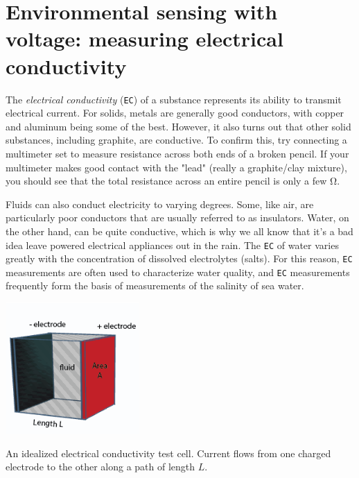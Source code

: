 %


\section{Environmental sensing with voltage: measuring electrical conductivity}
The \emph{electrical conductivity} (\texttt{EC}) of a substance represents its ability to transmit electrical current. For solids, metals are generally good conductors, with copper and aluminum being some of the best. However, it also turns out that other solid substances, including graphite, are conductive.  To confirm this, try connecting a multimeter set to measure resistance across both ends of a broken pencil.  If your multimeter makes good contact with the "lead" (really a graphite/clay mixture), you should see that the total resistance across an entire pencil is only a few \si{\ohm}. 

Fluids can also conduct electricity to varying degrees. Some, like air, are particularly poor conductors that are usually referred to as insulators. Water, on the other hand, can be quite conductive, which is why we all know that it's a bad idea leave powered electrical appliances out in the rain.  The \texttt{EC} of water varies greatly with the concentration of dissolved electrolytes (salts). For this reason, \texttt{EC} measurements are often used to characterize water quality, and \texttt{EC} measurements frequently form the basis of measurements of the salinity of sea water. 

\begin{marginfigure}[-5cm]
	\begin{center}
		\includegraphics[height=5cm]{Images/ec_cell.png}
		\caption[Ideal EC cell]{An idealized electrical conductivity test cell. Current flows from one charged electrode to the other along a path of length $L$.}
	\end{center}
\end{marginfigure}

